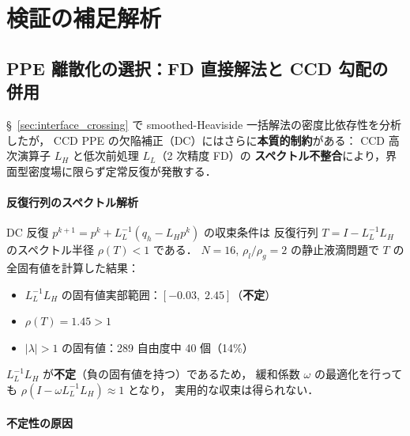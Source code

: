 %
\section{検証の補足解析}
\label{sec:appendix_verification}

\subsection{PPE 離散化の選択：FD 直接解法と CCD 勾配の併用}
\label{sec:ppe_discretization_choice}

§~\ref{sec:interface_crossing} で smoothed-Heaviside 一括解法の密度比依存性を分析したが，
CCD PPE の欠陥補正（DC）にはさらに\textbf{本質的制約}がある：
CCD 高次演算子 $L_H$ と低次前処理 $L_L$（2 次精度 FD）の
\textbf{スペクトル不整合}により，界面型密度場に限らず定常反復が発散する．

\paragraph{反復行列のスペクトル解析}

DC 反復 $p^{k+1} = p^k + L_L^{-1}(q_h - L_H p^k)$ の収束条件は
反復行列 $T = I - L_L^{-1} L_H$ のスペクトル半径 $\rho(T) < 1$ である．
$N = 16$, $\rho_l/\rho_g = 2$ の静止液滴問題で $T$ の全固有値を計算した結果：
\begin{itemize}[noitemsep]
  \item $L_L^{-1} L_H$ の固有値実部範囲：$[-0.03,\; 2.45]$（\textbf{不定}）
  \item $\rho(T) = 1.45 > 1$
  \item $|\lambda| > 1$ の固有値：289 自由度中 40 個（14\%）
\end{itemize}
$L_L^{-1} L_H$ が\textbf{不定}（負の固有値を持つ）であるため，
緩和係数 $\omega$ の最適化を行っても $\rho(I - \omega L_L^{-1} L_H) \approx 1$ となり，
実用的な収束は得られない．

\paragraph{不定性の原因}

